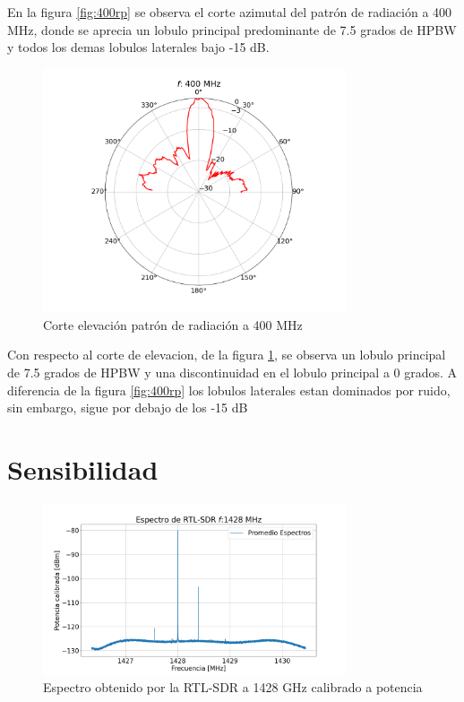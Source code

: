 En la figura \ref{fig:400rp} se observa el corte azimutal del patrón de radiación a 400 MHz, donde se aprecia un lobulo principal predominante de 7.5 grados de HPBW y todos los demas lobulos laterales bajo -15 dB.\\

\begin{figure}
    \centering
    \includegraphics[width=0.8\textwidth]{img/400rpel}
    \caption{Corte elevación patrón de radiación a 400 MHz}
    \label{fig:400rpel}
\end{figure}

Con respecto al corte de elevacion, de la figura \ref{fig:400rpel}, se observa un lobulo principal de 7.5 grados de HPBW y una discontinuidad en el lobulo principal a 0 grados. A diferencia de la figura \ref{fig:400rp} los lobulos laterales estan dominados por ruido, sin embargo, sigue por debajo de los -15 dB\\



\section{Sensibilidad}

\begin{figure}
    \centering
    \includegraphics[width=0.8\textwidth]{img/rtl1428}
    \caption{Espectro obtenido por la RTL-SDR a 1428 GHz calibrado a potencia}
    \label{fig:rtl1428}
\end{figure}


